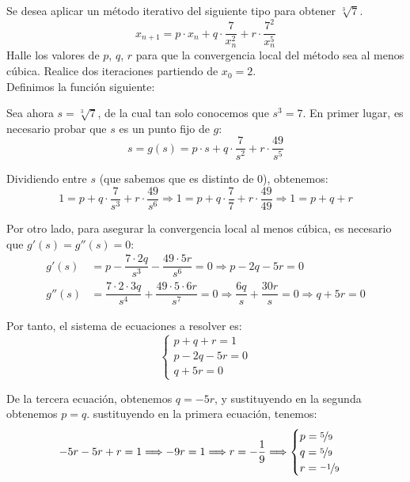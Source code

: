 \begin{ejercicio}\label{ej:1.1.10}
    Se desea aplicar un método iterativo del siguiente tipo para obtener $\sqrt[3]{7}$.
    $$x_{n+1} = p\cdot x_n + q\cdot \dfrac{7}{x^2_n} + r\cdot \dfrac{7^2}{x^5_n}$$
    Halle los valores de $p$, $q$, $r$ para que la convergencia local del método sea al menos cúbica. Realice dos iteraciones partiendo de $x_0 = 2$.\\

    Definimos la función siguiente:

    Sea ahora $s=\sqrt[3]{7}$, de la cual tan solo conocemos que $s^3=7$. En primer lugar, es necesario probar que $s$ es un punto fijo de $g$:
    \begin{equation*}
        s = g\left(s\right)=p\cdot s + q\cdot \dfrac{7}{s^2} + r\cdot \dfrac{49}{s^5}
    \end{equation*}

    Dividiendo entre $s$ (que sabemos que es distinto de 0), obtenemos:
    \begin{equation*}
        1 = p + q\cdot \dfrac{7}{s^3} + r\cdot \dfrac{49}{s^6}
        \Longrightarrow 1 = p + q\cdot \dfrac{7}{7} + r\cdot \dfrac{49}{49}
        \Longrightarrow 1 = p + q + r
    \end{equation*}

    Por otro lado, para asegurar la convergencia local al menos cúbica, es necesario que $g'(s)=g''(s)=0$:
    \begin{align*}
        g'(s)&=p-\dfrac{7\cdot 2q}{s^3}-\dfrac{49\cdot 5r}{s^6}=0
        \Longrightarrow p-2q-5r=0\\
        g''(s)&=\dfrac{7\cdot 2\cdot 3q}{s^4}+\dfrac{49\cdot 5\cdot 6r}{s^7}=0
        \Longrightarrow \dfrac{6q}{s}+\dfrac{30r}{s}=0
        \Longrightarrow q+5r=0
    \end{align*}

    Por tanto, el sistema de ecuaciones a resolver es:
    \begin{equation*}
        \begin{cases}
            p+q+r=1\\
            p-2q-5r=0\\
            q+5r=0
        \end{cases}
    \end{equation*}

    De la tercera ecuación, obtenemos $q=-5r$, y sustituyendo en la segunda obtenemos $p=q$. sustituyendo en la primera ecuación, tenemos:
    \begin{equation*}
        -5r-5r+r=1\Longrightarrow -9r=1\Longrightarrow r=-\dfrac{1}{9}
        \Longrightarrow\begin{cases}
            p=\nicefrac{5}{9}\\
            q=\nicefrac{5}{9}\\
            r=\nicefrac{-1}{9}
        \end{cases}
    \end{equation*}


\end{ejercicio}
